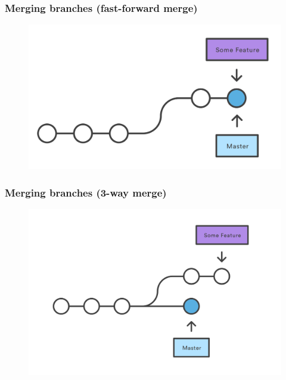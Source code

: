 \documentclass{beamer}
\begin{document}
\begin{frame}
\frametitle{Merging branches (fast-forward merge)}

\begin{figure}
\includegraphics[scale=0.8]{figures/f14.png}
\end{figure}

\end{frame}


\begin{frame}
\frametitle{Merging branches (3-way merge)}

\begin{figure}
\includegraphics[scale=0.8]{figures/f15.png}\hspace{1.5cm}
\end{figure}

\end{frame}
\end{document}
